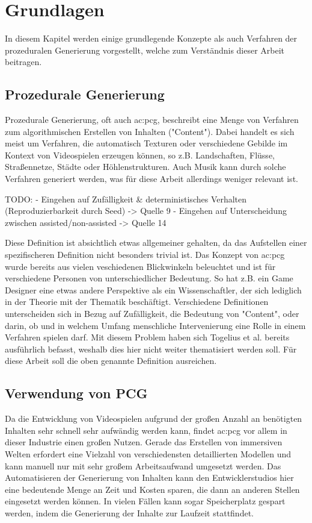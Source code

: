 %
\chapter{Grundlagen}
In diesem Kapitel werden einige grundlegende Konzepte als auch Verfahren der prozeduralen Generierung vorgestellt, welche zum
Verständnis dieser Arbeit beitragen.

\section{Prozedurale Generierung}
Prozedurale Generierung, oft auch \gls{ac:pcg}, beschreibt eine Menge von Verfahren zum
algorithmischen Erstellen von Inhalten ("Content"). Dabei handelt es sich meist um Verfahren, die automatisch Texturen
oder verschiedene Gebilde im Kontext von Videospielen erzeugen können, so z.B. Landschaften, Flüsse, Straßennetze,
Städte oder Höhlenstrukturen. Auch Musik kann durch solche Verfahren generiert werden, was für diese Arbeit allerdings
weniger relevant ist.\cite{9_togelius_et_al}

TODO:
- Eingehen auf Zufälligkeit \& deterministisches Verhalten (Reproduzierbarkeit durch Seed) -> Quelle 9
- Eingehen auf Unterscheidung zwischen assisted/non-assisted -> Quelle 14

Diese Definition ist absichtlich etwas allgemeiner gehalten, da das Aufstellen einer spezifischeren Definition nicht
besonders trivial ist. Das Konzept von \gls{ac:pcg} wurde bereits aus vielen veschiedenen Blickwinkeln beleuchtet und ist für verschiedene
Personen von unterschiedlicher Bedeutung. So hat z.B. ein Game Designer eine etwas andere Perspektive als ein Wissenschaftler, der
sich lediglich in der Theorie mit der Thematik beschäftigt. Verschiedene Definitionen unterscheiden sich in Bezug auf
Zufälligkeit, die Bedeutung von "Content", oder darin, ob und in welchem Umfang menschliche Intervenierung eine Rolle in einem
Verfahren spielen darf. Mit diesem Problem haben sich Togelius et al. \cite{9_togelius_et_al} bereits ausführlich befasst, weshalb dies hier
nicht weiter thematisiert werden soll. Für diese Arbeit soll die oben genannte Definition ausreichen.

\section{Verwendung von PCG}
Da die Entwicklung von Videospielen aufgrund der großen Anzahl an benötigten Inhalten sehr schnell sehr aufwändig werden
kann, findet \gls{ac:pcg} vor allem in dieser Industrie einen großen Nutzen. Gerade das Erstellen von immersiven Welten erfordert eine Vielzahl
von verschiedensten detaillierten Modellen und kann manuell nur mit sehr großem Arbeitsaufwand umgesetzt werden. Das Automatisieren der
Generierung von Inhalten kann den Entwicklerstudios hier eine bedeutende Menge an Zeit und Kosten sparen, die dann an anderen
Stellen eingesetzt werden können. In vielen Fällen kann sogar Speicherplatz gespart werden, indem die Generierung der Inhalte
zur Laufzeit stattfindet.

